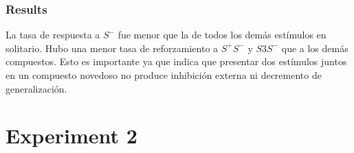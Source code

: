 \documentclass[a4paper,12pt]{article}
\begin{document}
\subsubsection{Results}

La tasa de respuesta a $S^{-}$ fue menor que la de todos los demás estímulos en solitario.
Hubo una menor tasa de reforzamiento a $S^{+}S^{-}$ y $S3S^{-}$ que a los demás compuestos.
Esto es importante ya que indica que presentar dos estímulos juntos en un compuesto novedoso no produce inhibición externa ni decremento de generalización.

\section{Experiment 2}
\end{document}
